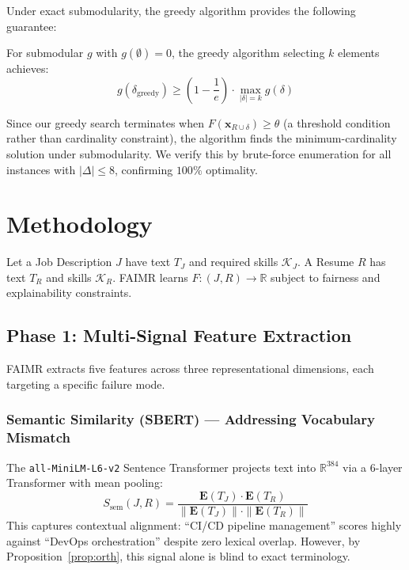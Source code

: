 \documentclass{llncs}
\begin{document}
Under exact submodularity, the greedy algorithm provides the following guarantee:

\begin{theorem}
For submodular $g$ with $g(\emptyset) = 0$, the greedy algorithm selecting $k$ elements achieves:
\begin{equation}
    g(\delta_\text{greedy}) \geq \left(1 - \frac{1}{e}\right) \cdot \max_{|\delta| = k} g(\delta)
\end{equation}
\end{theorem}

Since our greedy search terminates when $F(\mathbf{x}_{R \cup \delta}) \geq \theta$ (a threshold condition rather than cardinality constraint), the algorithm finds the minimum-cardinality solution under submodularity. We verify this by brute-force enumeration for all instances with $|\Delta| \leq 8$, confirming $100\%$ optimality.

\section{Methodology}\label{sec:method}

Let a Job Description $J$ have text $T_J$ and required skills $\mathcal{K}_J$. A Resume $R$ has text $T_R$ and skills $\mathcal{K}_R$. FAIMR learns $F: (J, R) \to \mathbb{R}$ subject to fairness and explainability constraints.

\subsection{Phase 1: Multi-Signal Feature Extraction}

FAIMR extracts five features across three representational dimensions, each targeting a specific failure mode.

\subsubsection{Semantic Similarity (SBERT) --- Addressing Vocabulary Mismatch}
The \texttt{all-MiniLM-L6-v2} Sentence Transformer projects text into $\mathbb{R}^{384}$ via a 6-layer Transformer with mean pooling:
\begin{equation}
    S_{\mathrm{sem}}(J, R) = \frac{\mathbf{E}(T_J) \cdot \mathbf{E}(T_R)}{\|\mathbf{E}(T_J)\| \cdot \|\mathbf{E}(T_R)\|}
\end{equation}
This captures contextual alignment: ``CI/CD pipeline management'' scores highly against ``DevOps orchestration'' despite zero lexical overlap. However, by Proposition~\ref{prop:orth}, this signal alone is blind to exact terminology.
\end{document}

